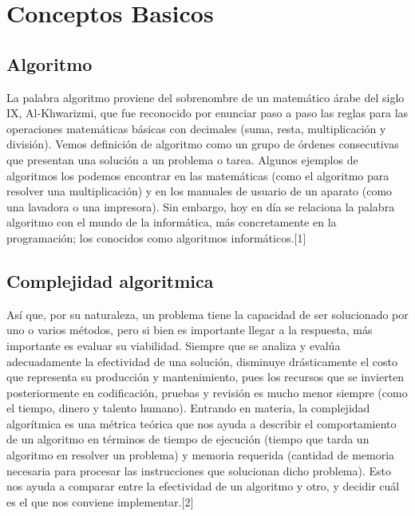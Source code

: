 \documentclass[spanish]{article}
\begin{document}
	\section{Conceptos Basicos}
	\subsection{Algoritmo}
		La palabra algoritmo proviene del sobrenombre de un matemático árabe del siglo IX, Al-Khwarizmi, que fue reconocido por enunciar paso a paso las reglas para las operaciones matemáticas básicas con decimales (suma, resta, multiplicación y división).	
		Vemos definición de algoritmo como un grupo de órdenes consecutivas que presentan una solución a un problema o tarea. Algunos ejemplos de algoritmos los podemos encontrar en las matemáticas (como el algoritmo para resolver una multiplicación) y en los manuales de usuario de un aparato (como una lavadora o una impresora).	
		Sin embargo, hoy en día se relaciona la palabra algoritmo con el mundo de la informática, más concretamente en la programación; los conocidos como algoritmos informáticos.[1]	
	\subsection{Complejidad algoritmica}
		Así que, por su naturaleza, un problema tiene la capacidad de ser solucionado por uno o varios métodos, pero si bien es importante llegar a la respuesta, más importante es evaluar su viabilidad. Siempre que se analiza y evalúa adecuadamente la efectividad de una solución, disminuye drásticamente el costo que representa su producción y mantenimiento, pues los recursos que se invierten posteriormente en codificación, pruebas y revisión es mucho menor siempre (como el tiempo, dinero y talento humano).	
		Entrando en materia, la complejidad algorítmica es una métrica teórica que nos ayuda a describir el comportamiento de un algoritmo en términos de tiempo de ejecución (tiempo que tarda un algoritmo en resolver un problema) y memoria requerida (cantidad de memoria necesaria para procesar las instrucciones que solucionan dicho problema). Esto nos ayuda a comparar entre la efectividad de un algoritmo y otro, y decidir cuál es el que nos conviene implementar.[2]
\end{document}
